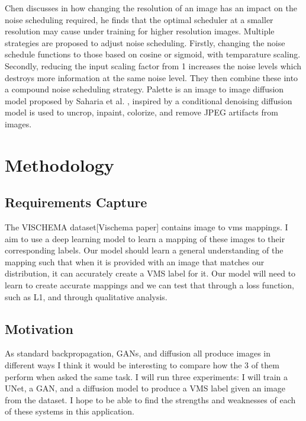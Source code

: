 \documentclass{UoYCSproject}
\begin{document}
Chen discusses in \cite{chen2023importance} how changing the resolution of an image has an impact on the noise scheduling required, he finds that the optimal scheduler at a smaller resolution may cause under training for higher resolution images. Multiple strategies are proposed to adjust noise scheduling. Firstly, changing the noise schedule functions to those based on cosine or sigmoid, with temparature scaling. Secondly, reducing the input scaling factor from 1 increases the noise levels which destroys more information at the same noise level. They then combine these into a compound noise scheduling strategy. Palette is an image to image diffusion model proposed by Saharia et al. \cite{saharia2022palette}, inspired by \cite{isola2018imagetoimage} a conditional denoising diffusion model is used to uncrop, inpaint, colorize, and remove JPEG artifacts from images.

\newpage{}

\chapter{Methodology}



\section{Requirements Capture}

The VISCHEMA dataset[Vischema paper] contains image to vms mappings. I aim to use a deep learning model to learn a mapping of these images to their corresponding labels. Our model should learn a general understanding of the mapping such that when it is provided with an image that matches our distribution, it can accurately create a VMS label for it. Our model will need to learn to create accurate mappings and we can test that through a loss function, such as L1, and through qualitative analysis.

\section{Motivation}

As standard backpropagation, GANs, and diffusion all produce images in different ways I think it would be interesting to compare how the 3 of them perform when asked the same task. I will run three experiments: I will train a UNet, a GAN, and a diffusion model to produce a VMS label given an image from the dataset. I hope to be able to find the strengths and weaknesses of each of these systems in this application.
\end{document}
